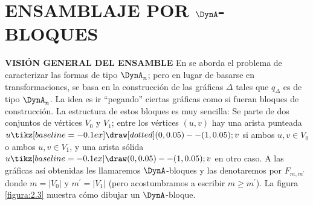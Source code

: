 \section{ENSAMBLAJE POR $\DynA$-BLOQUES}
\textbf{VISIÓN GENERAL DEL ENSAMBLE}
En \citep{Barot1999ACO} se aborda el problema de caracterizar las formas de tipo $\DynA_{n}$; pero en lugar de basarse en transformaciones, se basa en la construcción de las gráficas $\Delta$ tales que $q_{\Delta}$ es de tipo  $\DynA_{n}$. La idea es ir ``pegando'' ciertas gráficas como si fueran bloques de construcción. La estructura de estos bloques es muy sencilla: Se parte de dos conjuntos de vértices $V_{0}$ y $V_{1}$; entre los vértices $\left(u, v\right)$ hay una arista punteada $u\tikz[baseline=-0.1ex]\draw [dotted] (0,0.05) -- (1,0.05); v$ si ambos $u, v \in V_{0}$ o ambos $u, v \in V_{1}$, y una arista sólida $u \tikz[baseline=-0.1ex]\draw (0,0.05) -- (1,0.05); v$ en otro caso. A las gráficas así obtenidas les llamaremos $\DynA$-bloques y las denotaremos por $F_{m,m^{'}}$ donde $m = |V_{0}|$ y $m^{'} = |V_{1}|$ (pero acostumbramos a escribir $m \geq m^{'}$). La figura \ref{figura:2.3} muestra cómo dibujar un $\DynA$-bloque. \citep{AbarcaSoteloMarioAlberto2011Apds}\citep{Barot1999ACO}\\

